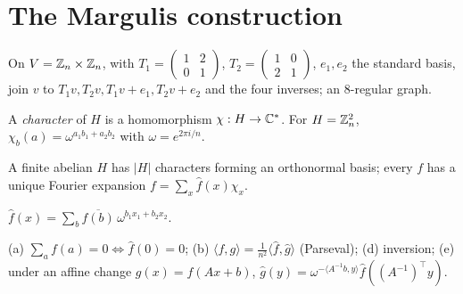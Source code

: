 \chapter{The Margulis construction}

\begin{construction}
  \label{constr:margulis-graph}
  On $V=\mathbb{Z}_n\times\mathbb{Z}_n$, with
  $T_1=\left(\begin{smallmatrix}1&2\\0&1\end{smallmatrix}\right)$,
  $T_2=\left(\begin{smallmatrix}1&0\\2&1\end{smallmatrix}\right)$,
  $e_1,e_2$ the standard basis, join $v$ to $T_1v,T_2v,T_1v+e_1,T_2v+e_2$ and the
  four inverses; an $8$-regular graph.
\end{construction}

\begin{definition}
  \label{def:character}
  \mathlibok
  A \emph{character} of $H$ is a homomorphism $\chi:H\to\mathbb{C}^*$. For $H=\mathbb{Z}_n^2$,
  $\chi_b(a)=\omega^{a_1b_1+a_2b_2}$ with $\omega=e^{2\pi i/n}$.
\end{definition}

\begin{proposition}
  \label{prop:characters-basis}
  \mathlibok
  A finite abelian $H$ has $|H|$ characters forming an orthonormal basis; every
  $f$ has a unique Fourier expansion $f=\sum_x\hat f(x)\chi_x$.
\end{proposition}

\begin{definition}
  \label{def:fourier-zn2}
  $\hat f(x)=\sum_b\overline{f(b)}\,\omega^{b_1x_1+b_2x_2}$.
\end{definition}

\begin{proposition}
  \label{prop:fourier-properties}
  \mathlibok
  (a) $\sum_af(a)=0\iff\hat f(0)=0$; (b) $\langle f,g\rangle=\frac1{n^2}\langle\hat
  f,\hat g\rangle$ (Parseval); (d) inversion; (e) under an affine change $g(x)=
  f(Ax+b)$, $\hat g(y)=\omega^{-\langle A^{-1}b,y\rangle}\hat f((A^{-1})^\top y)$.
\end{proposition}

